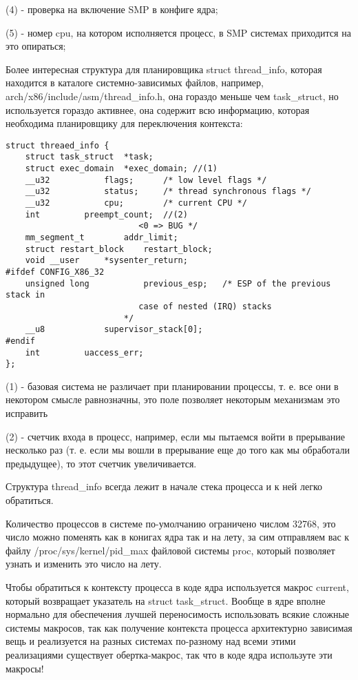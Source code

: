 (4) - проверка на включение SMP в конфиге ядра;

(5) - номер cpu, на котором исполняется процесс, в SMP системах приходится на это опираться;

Более интересная структура для планировщика struct thread\_info, которая находится в каталоге системно-зависимых файлов, например,
arch/x86/include/asm/thread\_info.h, она гораздо меньше чем task\_struct, но используется гораздо активнее, она содержит всю информацию, которая необходима
планировщику для переключения контекста:

\begin{lstlisting}
struct threaed_info {
	struct task_struct	*task;
	struct exec_domain	*exec_domain; //(1)
	__u32			flags;		/* low level flags */
	__u32			status;		/* thread synchronous flags */
	__u32			cpu;		/* current CPU */
	int			preempt_count;	//(2)
						   <0 => BUG */
	mm_segment_t		addr_limit;
	struct restart_block    restart_block;
	void __user		*sysenter_return;
#ifdef CONFIG_X86_32
	unsigned long           previous_esp;   /* ESP of the previous stack in
						   case of nested (IRQ) stacks
						*/
	__u8			supervisor_stack[0];
#endif
	int			uaccess_err;
};
\end{lstlisting}

(1) - базовая система не различает при планировании процессы, т. е. все они в некотором смысле равнозначны, это поле позволяет некоторым механизмам это исправить

(2) - счетчик входа в процесс, например, если мы пытаемся войти в прерывание несколько раз (т. е. если мы вошли в прерывание еще до того как мы обработали
предыдущее), то этот счетчик увеличивается.

Структура thread\_info всегда лежит в начале стека процесса и к ней легко обратиться.

Количество процессов в системе по-умолчанию ограничено числом 32768, это число можно поменять как в конигах ядра так и на лету, за сим отправляем вас к файлу
/proc/sys/kernel/pid\_max файловой системы proc, который позволяет узнать и изменить это число на лету.

Чтобы обратиться к контексту процесса в коде ядра используется макрос current, который возвращает указатель на struct task\_struct. Вообще в ядре вполне нормально
для обеспечения лучшей переносимость использовать всякие сложные системы макросов, так как получение контекста процесса архитектурно зависимая вещь и реализуется
на разных системах по-разному над всеми этими реализациями существует обертка-макрос, так что в коде ядра используте эти макросы!

